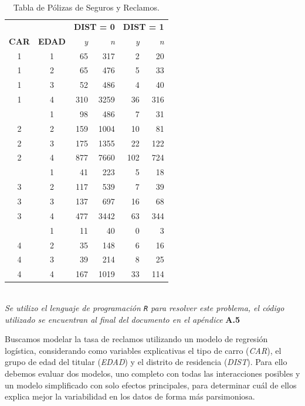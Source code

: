 \begin{table}[h!]
\centering
\begin{tabular}{cc rrrr}
\toprule
& & \multicolumn{2}{c}{\textbf{DIST = 0}} & \multicolumn{2}{c}{\textbf{DIST = 1}} \\
\cmidrule(lr){3-4} \cmidrule(lr){5-6}
\textbf{CAR} & \textbf{EDAD} & \textit{y} & \textit{n} & \textit{y} & \textit{n} \\
\midrule
1 & 1 & 65 & 317 & 2 & 20 \\
1 & 2 & 65 & 476 & 5 & 33 \\
1 & 3 & 52 & 486 & 4 & 40 \\
1 & 4 & 310 & 3259 & 36 & 316 \\
\addlinespace %
2 & 1 & 98 & 486 & 7 & 31 \\
2 & 2 & 159 & 1004 & 10 & 81 \\
2 & 3 & 175 & 1355 & 22 & 122 \\
2 & 4 & 877 & 7660 & 102 & 724 \\
\addlinespace
3 & 1 & 41 & 223 & 5 & 18 \\
3 & 2 & 117 & 539 & 7 & 39 \\
3 & 3 & 137 & 697 & 16 & 68 \\
3 & 4 & 477 & 3442 & 63 & 344 \\
\addlinespace
4 & 1 & 11 & 40 & 0 & 3 \\
4 & 2 & 35 & 148 & 6 & 16 \\
4 & 3 & 39 & 214 & 8 & 25 \\
4 & 4 & 167 & 1019 & 33 & 114 \\
\bottomrule
\end{tabular}
\caption{Tabla de Pólizas de Seguros y Reclamos.}
\label{tab:seguros}
\end{table}

\noindent{}\\

\textit{Se utilizo el lenguaje de programación \texttt{R} para resolver este problema, el código utilizado se encuentran al final del documento en el apéndice} \textbf{A.5}

Buscamos modelar la tasa de reclamos utilizando un modelo de regresión logística, considerando como variables explicativas el tipo de carro (\textit{CAR}), el grupo de edad del titular (\textit{EDAD}) y el distrito de residencia (\textit{DIST}). Para ello debemos evaluar dos modelos, uno completo con todas las interacciones posibles y un modelo simplificado con solo efectos principales, para determinar cuál de ellos explica mejor la variabilidad en los datos de forma más parsimoniosa.

